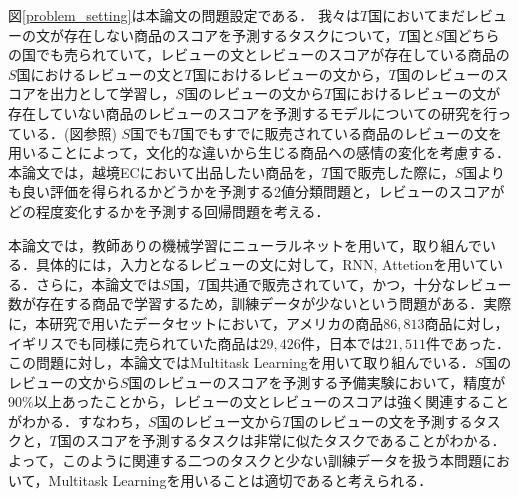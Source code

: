 \documentclass[dvipdfmx,twocolumn,10.5pt]{jsarticle}
\begin{document}
図\ref{problem_setting}は本論文の問題設定である．
我々は$T$国においてまだレビューの文が存在しない商品のスコアを予測するタスクについて，$T$国と$S$国どちらの国でも売られていて，レビューの文とレビューのスコアが存在している商品の$S$国におけるレビューの文と$T$国におけるレビューの文から，$T$国のレビューのスコアを出力として学習し，$S$国のレビューの文から$T$国におけるレビューの文が存在していない商品のレビューのスコアを予測するモデルについての研究を行っている．(図参照)
$S$国でも$T$国でもすでに販売されている商品のレビューの文を用いることによって，文化的な違いから生じる商品への感情の変化を考慮する．本論文では，越境ECにおいて出品したい商品を，$T$国で販売した際に，$S$国よりも良い評価を得られるかどうかを予測する2値分類問題と，レビューのスコアがどの程度変化するかを予測する回帰問題を考える．

本論文では，教師ありの機械学習にニューラルネットを用いて，取り組んでいる．具体的には，入力となるレビューの文に対して，RNN, Attetionを用いている．さらに，本論文では$S$国，$T$国共通で販売されていて，かつ，十分なレビュー数が存在する商品で学習するため，訓練データが少ないという問題がある．実際に，本研究で用いたデータセットにおいて，アメリカの商品$86,813$商品に対し，イギリスでも同様に売られていた商品は$29,426$件，日本では$21,511$件であった．
この問題に対し，本論文ではMultitask Learningを用いて取り組んでいる．$S$国のレビューの文から$S$国のレビューのスコアを予測する予備実験において，精度が90\%以上あったことから，レビューの文とレビューのスコアは強く関連することがわかる．すなわち，$S$国のレビュー文から$T$国のレビューの文を予測するタスクと，$T$国のスコアを予測するタスクは非常に似たタスクであることがわかる．よって，このように関連する二つのタスクと少ない訓練データを扱う本問題において，Multitask Learningを用いることは適切であると考えられる．
\end{document}
